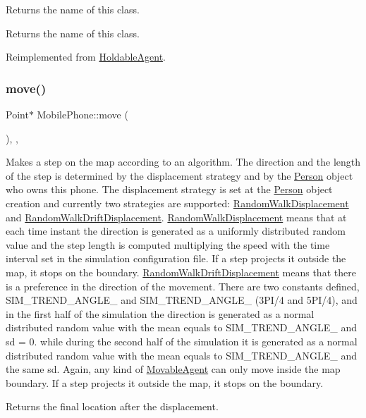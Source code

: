 Returns the name of this class. \begin{DoxyReturn}{Returns}
the name of this class. 
\end{DoxyReturn}


Reimplemented from \mbox{\hyperlink{class_holdable_agent_ab330bb40de51a957ef8826af629f94a2}{Holdable\+Agent}}.

\mbox{\label{class_mobile_phone_a785d0cac08252386603c702ad8f38c5b}} 
\subsubsection{\texorpdfstring{move()}{move()}}
{\footnotesize\ttfamily Point$\ast$ Mobile\+Phone\+::move (\begin{DoxyParamCaption}{ }\end{DoxyParamCaption})\hspace{0.3cm}{\ttfamily [inline]}, {\ttfamily [override]}, {\ttfamily [virtual]}}

Makes a step on the map according to an algorithm. The direction and the length of the step is determined by the displacement strategy and by the \mbox{\hyperlink{class_person}{Person}} object who owns this phone. The displacement strategy is set at the \mbox{\hyperlink{class_person}{Person}} object creation and currently two strategies are supported\+: \mbox{\hyperlink{class_random_walk_displacement}{Random\+Walk\+Displacement}} and \mbox{\hyperlink{class_random_walk_drift_displacement}{Random\+Walk\+Drift\+Displacement}}. \mbox{\hyperlink{class_random_walk_displacement}{Random\+Walk\+Displacement}} means that at each time instant the direction is generated as a uniformly distributed random value and the step length is computed multiplying the speed with the time interval set in the simulation configuration file. If a step projects it outside the map, it stops on the boundary. \mbox{\hyperlink{class_random_walk_drift_displacement}{Random\+Walk\+Drift\+Displacement}} means that there is a preference in the direction of the movement. There are two constants defined, S\+I\+M\+\_\+\+T\+R\+E\+N\+D\+\_\+\+A\+N\+G\+L\+E\+\_ and S\+I\+M\+\_\+\+T\+R\+E\+N\+D\+\_\+\+A\+N\+G\+L\+E\+\_ (3P\+I/4 and 5P\+I/4), and in the first half of the simulation the direction is generated as a normal distributed random value with the mean equals to S\+I\+M\+\_\+\+T\+R\+E\+N\+D\+\_\+\+A\+N\+G\+L\+E\+\_ and sd = 0. while during the second half of the simulation it is generated as a normal distributed random value with the mean equals to S\+I\+M\+\_\+\+T\+R\+E\+N\+D\+\_\+\+A\+N\+G\+L\+E\+\_ and the same sd. Again, any kind of \mbox{\hyperlink{class_movable_agent}{Movable\+Agent}} can only move inside the map boundary. If a step projects it outside the map, it stops on the boundary. \begin{DoxyReturn}{Returns}
the final location after the displacement. 
\end{DoxyReturn}



